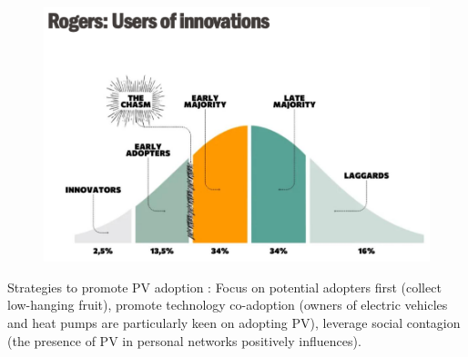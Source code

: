 \documentclass[../main.tex]{subfiles}
\begin{document}
\begin{figure}[hbt!]
    \centering
    \includegraphics[width=0.5\linewidth]{IMAGES/NRJ_supply/Screenshot from 2025-04-30 08-56-36.png}
\end{figure}

Strategies to promote PV adoption : Focus on potential adopters first (collect low-hanging fruit), promote technology co-adoption (owners of electric vehicles and heat pumps are particularly keen on adopting PV), leverage social contagion (the presence of PV in personal networks positively influences).\\
\end{document}
